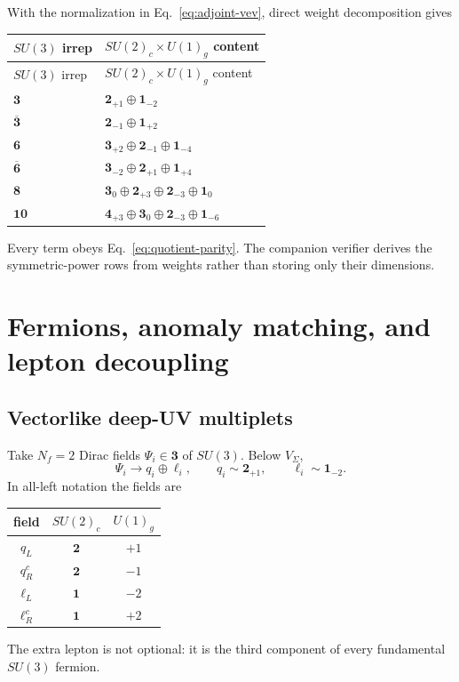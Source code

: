 \documentclass[11pt]{article}
\theoremstyle{definition}
\theoremstyle{remark}
\begin{document}
With the normalization in Eq.~\eqref{eq:adjoint-vev}, direct weight
decomposition gives \cite{Slansky1981}
\begin{longtable}{@{}L{0.16\textwidth}L{0.72\textwidth}@{}}
\toprule
\(SU(3)\) irrep & \(SU(2)_c\times U(1)_g\) content\\
\midrule
\endfirsthead
\toprule
\(SU(3)\) irrep & \(SU(2)_c\times U(1)_g\) content\\
\midrule
\endhead
\(\bm3\) & \(\bm2_{+1}\oplus\bm1_{-2}\)\\
\(\overline{\bm3}\) & \(\bm2_{-1}\oplus\bm1_{+2}\)\\
\(\bm6\) & \(\bm3_{+2}\oplus\bm2_{-1}\oplus\bm1_{-4}\)\\
\(\overline{\bm6}\) & \(\bm3_{-2}\oplus\bm2_{+1}\oplus\bm1_{+4}\)\\
\(\bm8\) & \(\bm3_0\oplus\bm2_{+3}\oplus\bm2_{-3}\oplus\bm1_0\)\\
\(\bm{10}\) & \(\bm4_{+3}\oplus\bm3_0\oplus\bm2_{-3}\oplus\bm1_{-6}\)\\
\bottomrule
\end{longtable}
Every term obeys Eq.~\eqref{eq:quotient-parity}.  The companion verifier
derives the symmetric-power rows from weights rather than storing only their
dimensions.

\section{Fermions, anomaly matching, and lepton decoupling}

\subsection{Vectorlike deep-UV multiplets}

Take \(N_f=2\) Dirac fields \(\Psi_i\in\bm3\) of \(SU(3)\).  Below
\(V_\Sigma\),
\begin{equation}
 \Psi_i\longrightarrow q_i\oplus\ell_i,\qquad
 q_i\sim\bm2_{+1},\qquad
 \ell_i\sim\bm1_{-2}.
 \label{eq:quark-lepton-split}
\end{equation}
In all-left notation the fields are
\begin{center}
\begin{tabular}{@{}ccc@{}}
\toprule
field & \(SU(2)_c\) & \(U(1)_g\)\\
\midrule
\(q_L\) & \(\bm2\) & \(+1\)\\
\(q_R^c\) & \(\bm2\) & \(-1\)\\
\(\ell_L\) & \(\bm1\) & \(-2\)\\
\(\ell_R^c\) & \(\bm1\) & \(+2\)\\
\bottomrule
\end{tabular}
\end{center}
The extra lepton is not optional: it is the third component of every
fundamental \(SU(3)\) fermion.
\end{document}
